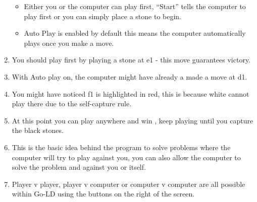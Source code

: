 \documentclass{l4proj}
\begin{document}
\begin{appendices}
\begin{enumerate}
\begin{itemize}
\item Either you or the computer can play first, “Start” tells the computer to play first or you can simply place a stone to begin.

\item Auto Play is enabled by default this means the computer automatically plays once you make a move.
\end{itemize}

\item You should play first by playing a stone at e1 - this move guarantees victory.

\item With Auto play on, the computer might have already a made a move at d1.

\item You might have noticed f1 is highlighted in red, this is because white cannot play there due to the self-capture rule.

\item At this point you can play anywhere and win , keep playing until you capture the black stones.

\item This is the basic idea behind the program to solve problems where the computer will try to play against you, you can also allow the computer to solve the problem and against you or itself.

\item Player v player,  player v computer or computer v computer are all possible within Go-LD using the buttons on the right of the screen.
\end{enumerate}


\end{appendices}





\end{document}
